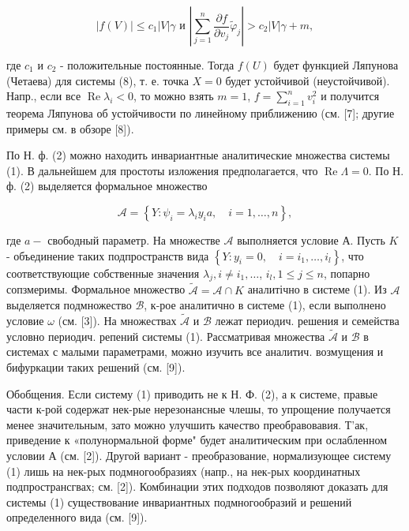 \documentclass[10pt]{article}
\begin{document}
\[

|f(V)| \leqslant c_{1}|V| \gamma \text { и }\left|\sum_{j=1}^{n} \frac{\partial f}{\partial v_{j}} \tilde{\varphi}_{j}\right|>c_{2}|V| \gamma+m,

\]



где $c_{1}$ и $c_{2}$ - положительные постоянные. Тогда $f(U)$ будет функцией Ляпунова (Четаева) для системы (8), т. е. точка $X=0$ будет устойчивой (неустойчивой). Напр., если все $\operatorname{Re} \lambda_{i}<0$, то можно взять $m=1$, $f=\sum_{i=1}^{n} v_{i}^{2}$ и получится теорема Ляпунова об устойчивости по линейному приближению (см. [7]; другие примеры см. в обзоре [8]).



По Н. ф. (2) можно находить инвариантные аналитические множества системы (1). В дальнейшем для простоты изложения предполагается, что $\operatorname{Re} \Lambda=0$. По Н. ф. (2) выделяется формальное множество



\[

\mathcal{A}=\left\{Y: \psi_{i}=\lambda_{i} y_{i} a, \quad i=1, \ldots, n\right\},

\]



где $a-$ свободный параметр. На множестве $\mathcal{A}$ выполняется условие А. Пусть $K$ - объединение таких подпространств вида $\left\{Y: y_{i}=0, \quad i=i_{1}, \ldots, i_{l}\right\}$, что соответствующие собственные значения $\lambda_{j}, i \neq i_{1}, \ldots$, $i_{l}, 1 \leqslant j \leqslant n$, попарно сопзмеримы. Формальное множество $\tilde{\mathcal{A}}=\mathcal{A} \cap K$ аналитічно в системе (1). Из $\mathcal{A}$ выделяется подмножество $\mathscr{B}$, к-рое аналитично в системе (1), если выполнено условие $\omega$ (см. [3]). На множествах $\tilde{\mathcal{A}}$ и $\mathscr{B}$ лежат периодич. решения и семейства условно периодич. репений системы (1). Рассматривая множества $\tilde{\mathscr{A}}$ и $\mathscr{B}$ в системах с малыми параметрами, можно изучить все аналитич. возмущения и бифуркации таких решений (см. [9]).



Обобщения. Если систему (1) приводить не к Н. Ф. (2), а к системе, правые части к-рой содержат нек-рые нерезонансные члешы, то упрощение получается менее значительным, зато можно улучшить качество преобравовавия. Т'ак, приведение к «полунормальной форме" будет аналитическим при ослабленном условии А (см. [2]). Другой вариант - преобразование, нормализующее систему (1) лишь на нек-рых подмногообразиях (напр., на нек-рых координатных подпространсгвах; см. [2]). Комбинации этих подходов позволяют доказать для системы (1) существование инвариантных подмногообразий и решений определенного вида (см. [9]).
\end{document}

